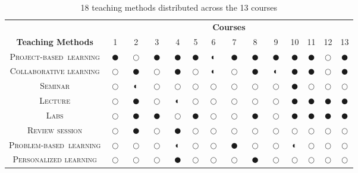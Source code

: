 \documentclass[10pt,conference]{IEEEtran}
\begin{document}
\begin{table}[ht]
\centering
\caption{18 teaching methods distributed across the 13 courses}
\label{tab:strategiesUsed}
\begin{tabular}{|cccccccccccccc|} 
\hline
                                & \multicolumn{13}{c|}{\textbf{Courses}}                                                                                                                                  \\ 
\cline{2-14}
\textbf{Teaching Methods}       & ~1~        & ~2~        & ~3~        & ~4~        & 5          & ~6~        & ~7~        & ~8~        & ~9~        & 10         & 11         & 12         & 13          \\ 
\hline
\textsc{Project-based~learning}          & $\CIRCLE$ & $\Circle$ & $\CIRCLE$ & $\CIRCLE$ & $\CIRCLE$ & $\LEFTcircle$ & $\CIRCLE$ & $\CIRCLE$ & $\CIRCLE$ & $\CIRCLE$ & $\CIRCLE$ & $\Circle$ & $\CIRCLE$  \\
\textsc{Collaborative learning}          & $\Circle$ & $\CIRCLE$ & $\Circle$ & $\CIRCLE$ & $\Circle$ & $\LEFTcircle$ & $\Circle$ & $\CIRCLE$ & $\LEFTcircle$ & $\CIRCLE$ & $\CIRCLE$ & $\Circle$ & $\CIRCLE$  \\
\textsc{Seminar}                         & $\Circle$ & $\LEFTcircle$ & $\Circle$ & $\Circle$ & $\Circle$ & $\Circle$ & $\Circle$ & $\Circle$ & $\Circle$ & $\CIRCLE$ & $\Circle$ & $\Circle$ & $\Circle$  \\
\textsc{Lecture}                         & $\Circle$ & $\CIRCLE$ & $\Circle$ & $\LEFTcircle$ & $\Circle$ & $\Circle$ & $\Circle$ & $\Circle$ & $\Circle$ & $\CIRCLE$ & $\CIRCLE$ & $\CIRCLE$ & $\CIRCLE$  \\
\textsc{Labs}                            & $\Circle$ & $\CIRCLE$ & $\CIRCLE$ & $\Circle$ & $\CIRCLE$ & $\Circle$ & $\Circle$ & $\CIRCLE$ & $\Circle$ & $\CIRCLE$ & $\CIRCLE$ & $\CIRCLE$ & $\CIRCLE$  \\
\textsc{Review session}                  & $\Circle$ & $\CIRCLE$ & $\Circle$ & $\CIRCLE$ & $\Circle$ & $\Circle$ & $\Circle$ & $\Circle$ & $\Circle$ & $\Circle$ & $\Circle$ & $\Circle$ & $\Circle$  \\
\textsc{Problem-based~learning}          & $\Circle$ & $\Circle$ & $\Circle$ & $\LEFTcircle$ & $\Circle$ & $\Circle$ & $\CIRCLE$ & $\Circle$ & $\Circle$ & $\LEFTcircle$ & $\Circle$ & $\Circle$ & $\Circle$  \\
\textsc{Personalized learning}           & $\Circle$ & $\Circle$ & $\Circle$ & $\CIRCLE$ & $\Circle$ & $\Circle$ & $\Circle$ & $\CIRCLE$ & $\Circle$ & $\Circle$ & $\Circle$ & $\Circle$ & $\Circle$  \\

\end{tabular}
\end{table}
\end{document}
